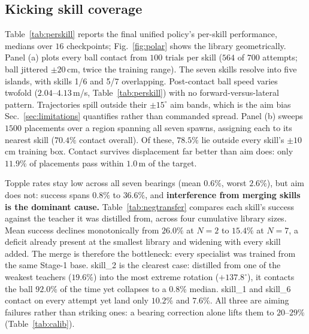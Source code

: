 \documentclass[letterpaper, 10 pt, conference]{ieeeconf}  %
\begin{document}
\subsection{Kicking skill coverage}

Table~\ref{tab:perskill} reports the final unified policy's per-skill
performance, medians over $16$ checkpoints; Fig.~\ref{fig:polar} shows the
library geometrically. Panel (a) plots every ball contact from $100$ trials
per skill ($564$ of $700$ attempts; ball jittered $\pm20$\,cm, twice the
training range). The seven skills resolve into five islands, with skills 1/6
and 5/7 overlapping. Post-contact ball speed varies twofold
($2.04$--$4.13$\,m/s, Table~\ref{tab:perskill}) with no forward-versus-lateral
pattern. Trajectories spill outside their $\pm15^\circ$ aim bands, which is
the aim bias Sec.~\ref{sec:limitations} quantifies rather than commanded
spread. Panel (b) sweeps $1500$ placements over a region spanning all seven
spawns, assigning each to its nearest skill ($70.4\%$ contact overall). Of
these, $78.5\%$ lie outside every skill's $\pm10$\,cm training box. Contact
survives displacement far better than aim does: only $11.9\%$ of placements
pass within $1.0$\,m of the target.

Topple rates stay low across all seven bearings (mean $0.6\%$, worst
$2.6\%$), but aim does not: success spans $0.8\%$ to $36.6\%$, and
\textbf{interference from merging skills is the dominant cause.}
Table~\ref{tab:negtransfer} compares each skill's success against the
teacher it was distilled from, across four cumulative library sizes. Mean
success declines monotonically from $26.0\%$ at $N{=}2$ to $15.4\%$ at
$N{=}7$, a deficit already present at the smallest library and widening with
every skill added. The merge is therefore the bottleneck: every specialist was trained
from the same Stage-1 base. skill\_2 is the clearest case: distilled from one of the
weakest teachers ($19.6\%$) into the most extreme rotation ($+137.8^\circ$),
it contacts the ball $92.0\%$ of the time yet collapses to a $0.8\%$ median.
skill\_1 and skill\_6 contact on every attempt yet land only $10.2\%$ and
$7.6\%$. All three are aiming failures rather than striking ones: a bearing
correction alone lifts them to $20$--$29\%$ (Table~\ref{tab:calib}).
\end{document}
